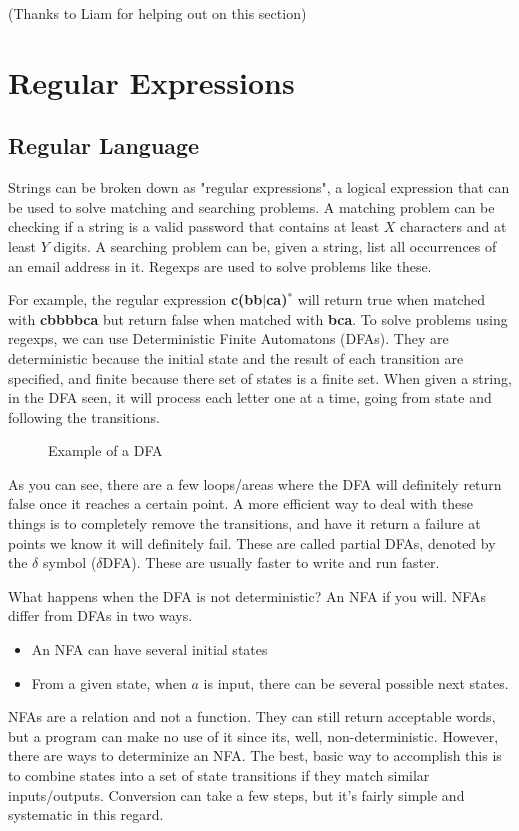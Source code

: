 (Thanks to Liam for helping out on this section)
\section{Regular Expressions}
\subsection{Regular Language}
Strings can be broken down as "regular expressions", a logical expression that can be used to solve matching and searching problems. A matching problem can be checking if a string is a valid password that contains at least $X$ characters and at least $Y$ digits. A searching problem can be, given a string, list all occurrences of an email address in it. Regexps are used to solve problems like these.

For example, the regular expression \textbf{c(bb$|$ca)$^*$} will return true when matched with \textbf{cbbbbca} but return false when matched with \textbf{bca}. To solve problems using regexps, we can use Deterministic Finite Automatons (DFAs). They are deterministic because the initial state and the result of each transition are specified, and finite because there set of states is a finite set. When given a string, in the DFA seen, it will process each letter one at a time, going from state and following the transitions.

\begin{figure}[!htb]
	\caption{\label{fig:dfa} Example of a DFA}
\end{figure}

As you can see, there are a few loops/areas where the DFA will definitely return false once it reaches a certain point. A more efficient way to deal with these things is to completely remove the transitions, and have it return a failure at points we know it will definitely fail. These are called partial DFAs, denoted by the $\delta$ symbol ($\delta$DFA). These are usually faster to write and run faster.

What happens when the DFA is not deterministic? An NFA if you will. NFAs differ from DFAs in two ways.
\begin{itemize}
	\item An NFA can have several initial states
	\item From a given state, when $a$ is input, there can be several possible next states.
\end{itemize}
NFAs are a relation and not a function. They can still return acceptable words, but a program can make no use of it since its, well, non-deterministic. However, there are ways to determinize an NFA. The best, basic way to accomplish this is to combine states into a set of state transitions if they match similar inputs/outputs. Conversion can take a few steps, but it's fairly simple and systematic in this regard.

